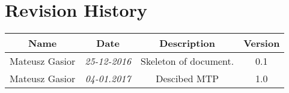 
\chapter*{Revision History}

\begin{center}
    \begin{tabular}{|c|c|c|c|}
        \hline
	    Name & Date & Description & Version\\ \hline
	    Mateusz Gasior & \emph{25-12-2016} & Skeleton of document. & 0.1 \\ \hline
	    Mateusz Gasior & \emph{04-01.2017} & Descibed MTP & 1.0 \\
        \hline
    \end{tabular}
\end{center}

